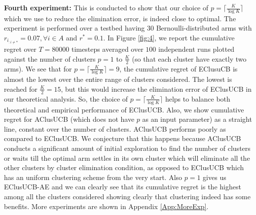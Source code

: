 \textbf{Fourth experiment:} This is conducted to show that our choice of $p=\lceil\frac{K}{\log K}\rceil$ which we use to reduce the elimination error, is indeed close to optimal. The experiment is performed over a testbed having $30$ Bernoulli-distributed arms with $r_{i_{:{{i}\neq {*}}}}=0.07,\forall i\in A$ and $r^{*}=0.1$. In Figure \ref{fig:4}, we report the cumulative regret over $T=80000$ timesteps averaged over $100$ independent runs plotted against the number of clusters $p=1$ to $\frac{K}{2}$ (so that each cluster have exactly two arms). We see that for $p=\lceil\frac{K}{\log K}\rceil=9$, the cumulative regret of EClusuCB is almost the lowest over the entire range of clusters considered. The lowest is reached for $\frac{K}{2}=15$, but this would increase the elimination error of EClusUCB in our theoretical analysis. So, the choice of $p=\lceil\frac{K}{\log K}\rceil$ helps to balance both theoretical and empirical performance of EClusUCB. Also, we show cumulative regret for AClusUCB (which does not have $p$ as an input parameter) as a straight line, constant over the number of clusters. AClusUCB  performs poorly as compared to EClusUCB. We conjecture that this happens because AClusUCB conducts a significant amount of initial exploration to find the number of clusters or waits till the optimal arm settles in its own cluster which will eliminate all the other clusters by cluster elimination condition, as opposed to EClusUCB which has an uniform clustering scheme from the very start. Also $p=1$ gives us EClusUCB-AE and we can clearly see that its cumulative regret is the highest among all the clusters considered showing clearly that clustering indeed has some benefits. More experiments are shown in Appendix \ref{App:MoreExp}.




